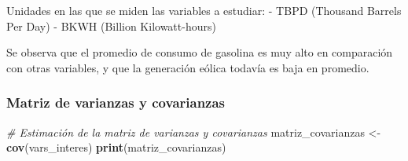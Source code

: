 \documentclass[
]{article}
\newenvironment{Shaded}{\begin{snugshade}}{\end{snugshade}}
\newcommand{\CommentTok}[1]{\textcolor[rgb]{0.56,0.35,0.01}{\textit{#1}}}
\newcommand{\FunctionTok}[1]{\textcolor[rgb]{0.13,0.29,0.53}{\textbf{#1}}}
\newcommand{\NormalTok}[1]{#1}
\newcommand{\OtherTok}[1]{\textcolor[rgb]{0.56,0.35,0.01}{#1}}
\begin{document}
Unidades en las que se miden las variables a estudiar: - TBPD (Thousand
Barrels Per Day) - BKWH (Billion Kilowatt-hours)

Se observa que el promedio de consumo de gasolina es muy alto en
comparación con otras variables, y que la generación eólica todavía es
baja en promedio.

\subsubsection{Matriz de varianzas y
covarianzas}\label{matriz-de-varianzas-y-covarianzas}

\begin{Shaded}
\begin{Highlighting}[]
\CommentTok{\# Estimación de la matriz de varianzas y covarianzas}
\NormalTok{matriz\_covarianzas }\OtherTok{\textless{}{-}} \FunctionTok{cov}\NormalTok{(vars\_interes)}
\FunctionTok{print}\NormalTok{(matriz\_covarianzas)}
\end{Highlighting}
\end{Shaded}
\end{document}
